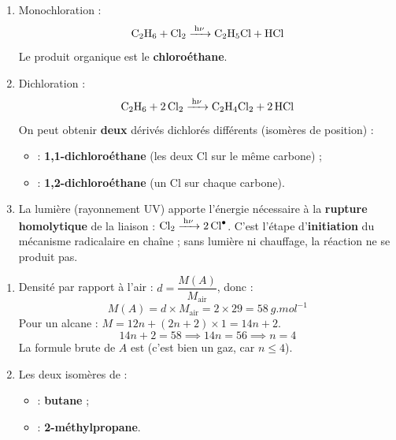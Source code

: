 \documentclass[11pt]{article}
\begin{document}
\begin{corrige}
\begin{enumerate}
\item Monochloration :
\[ \ce{C2H6 + Cl2 ->[h\nu] C2H5Cl + HCl} \]
Le produit organique  est le \textbf{chloroéthane}.
\item Dichloration :
\[ \ce{C2H6 + 2 Cl2 ->[h\nu] C2H4Cl2 + 2 HCl} \]
On peut obtenir \textbf{deux} dérivés dichlorés différents (isomères de position) :
\begin{itemize}
\item {} : \textbf{1,1-dichloroéthane} (les deux Cl sur le même carbone) ;
\item {} : \textbf{1,2-dichloroéthane} (un Cl sur chaque carbone).
\end{itemize}
\item La lumière (rayonnement UV) apporte l'énergie nécessaire à la \textbf{rupture homolytique} de la liaison  : $\ce{Cl2 ->[h\nu] 2 Cl^.}$. C'est l'étape d'\textbf{initiation} du mécanisme radicalaire en chaîne ; sans lumière ni chauffage, la réaction ne se produit pas.
\end{enumerate}
\end{corrige}

\begin{corrige}
\begin{enumerate}
\item Densité par rapport à l'air : $d = \dfrac{M(A)}{M_{\text{air}}}$, donc :
\[ M(A) = d \times M_{\text{air}} = 2 \times 29 = \SI{58}{g.mol^{-1}} \]
Pour un alcane : $M = 12n + (2n+2)\times1 = 14n + 2$.
\[ 14n + 2 = 58 \implies 14n = 56 \implies n = 4 \]
La formule brute de $A$ est  (c'est bien un gaz, car $n \le 4$).
\item Les deux isomères de  :
\begin{itemize}
\item {} : \textbf{butane} ;
\item {} : \textbf{2-méthylpropane}.
\end{itemize}
\end{enumerate}
\end{corrige}
\end{document}

